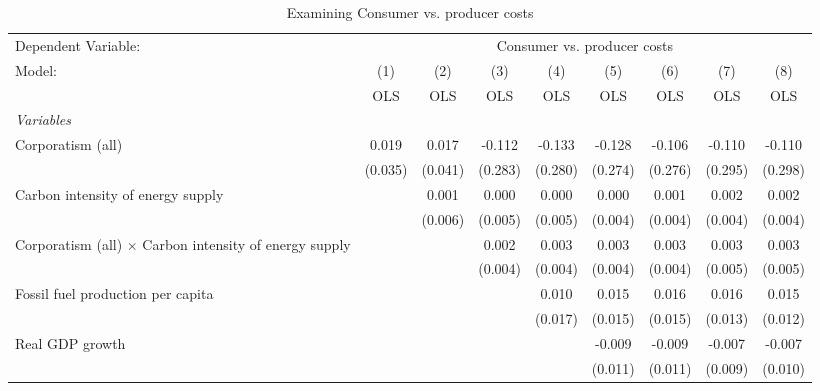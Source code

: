 
\begin{table}[htbp]
   \caption{Examining Consumer vs. producer costs}
   \centering
   \begin{tabular}{lcccccccc}
      \toprule
      Dependent Variable: & \multicolumn{8}{c}{Consumer vs. producer costs}\\
      Model:                                                        & (1)     & (2)     & (3)     & (4)     & (5)     & (6)     & (7)     & (8)\\  
                                                                    &  OLS    & OLS     & OLS     & OLS     & OLS     & OLS     & OLS     & OLS\\  
      \midrule
      \emph{Variables}\\
      Corporatism (all)                                             & 0.019   & 0.017   & -0.112  & -0.133  & -0.128  & -0.106  & -0.110  & -0.110\\   
                                                                    & (0.035) & (0.041) & (0.283) & (0.280) & (0.274) & (0.276) & (0.295) & (0.298)\\   
      Carbon intensity of energy supply                             &         & 0.001   & 0.000   & 0.000   & 0.000   & 0.001   & 0.002   & 0.002\\   
                                                                    &         & (0.006) & (0.005) & (0.005) & (0.004) & (0.004) & (0.004) & (0.004)\\   
      Corporatism (all) $\times$ Carbon intensity of energy supply  &         &         & 0.002   & 0.003   & 0.003   & 0.003   & 0.003   & 0.003\\   
                                                                    &         &         & (0.004) & (0.004) & (0.004) & (0.004) & (0.005) & (0.005)\\   
      Fossil fuel production per capita                             &         &         &         & 0.010   & 0.015   & 0.016   & 0.016   & 0.015\\   
                                                                    &         &         &         & (0.017) & (0.015) & (0.015) & (0.013) & (0.012)\\   
      Real GDP growth                                               &         &         &         &         & -0.009  & -0.009  & -0.007  & -0.007\\   
                                                                    &         &         &         &         & (0.011) & (0.011) & (0.009) & (0.010)\\   

\end{tabular}
\end{table}
